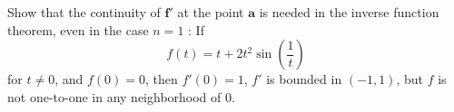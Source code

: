 \begin{myExercise}
    \label{ex:9.16}
    Show that the continuity of $\mathbf{f}'$ at the point $\mathbf{a}$ is needed in the inverse function theorem, even in the case $n = 1$ : If
    \begin{equation*}
        f(t) = t+2t^2\sin \left( \frac{1}{t} \right)
    \end{equation*} 
    for $t \neq 0$, and $f(0) = 0$, then $f'(0) = 1$, $f'$ is bounded in $(-1, 1)$, 
    but $f$ is not one-to-one in any neighborhood of 0.
\end{myExercise}


\begin{myExercise}
    \label{ex:9.17}
\end{myExercise}


\begin{myExercise}
    \label{ex:9.18}
\end{myExercise}


\begin{myExercise}
    \label{ex:9.19}
\end{myExercise}


\begin{myExercise}
    \label{ex:9.20}
\end{myExercise}


\begin{myExercise}
    \label{ex:9.21}
\end{myExercise}


\begin{myExercise}
    \label{ex:9.22}
\end{myExercise}


\begin{myExercise}
    \label{ex:9.23}
\end{myExercise}


\begin{myExercise}
    \label{ex:9.24}
\end{myExercise}


\begin{myExercise}
    \label{ex:9.25}
\end{myExercise}


\begin{myExercise}
    \label{ex:9.26}
\end{myExercise}


\begin{myExercise}
    \label{ex:9.27}
\end{myExercise}


\begin{myExercise}
    \label{ex:9.28}
\end{myExercise}


